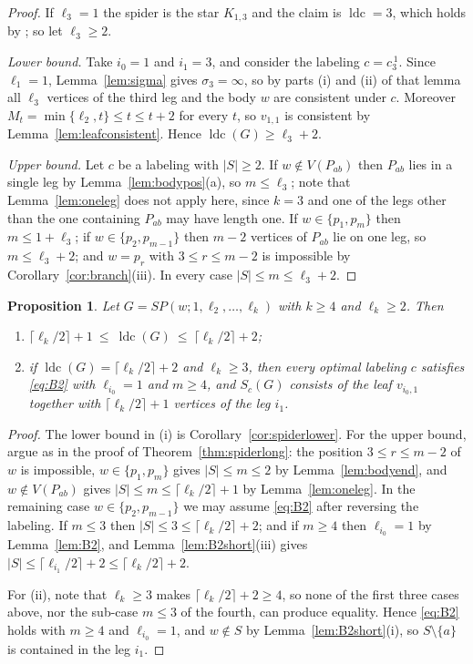 \documentclass[reqno,10pt]{article}
\newtheorem{proposition}[theorem]{Proposition}
\theoremstyle{definition}
\numberwithin{equation}{section}
\numberwithin{theorem}{section}
\newcommand{\ldc}{\operatorname{ldc}}
\newcommand{\Ntwo}{M}
\begin{document}
\begin{proof}
If $\ell_3=1$ the spider is the star $K_{1,3}$ and the claim is $\ldc=3$, which
holds by \cite[Proposition 4.4]{CH2025}; so let $\ell_3\ge2$.

\emph{Lower bound.} Take $i_0=1$ and $i_1=3$, and consider the labeling
$c=c_3^{\,1}$. Since $\ell_1=1$, Lemma~\ref{lem:sigma} gives $\sigma_3=\infty$,
so by parts (i) and (ii) of that lemma all $\ell_3$ vertices of the third leg
and the body $w$ are consistent under $c$. Moreover
$\Ntwo_t=\min\{\ell_2,t\}\le t\le t+2$ for every $t$, so $v_{1,1}$ is consistent by
Lemma~\ref{lem:leafconsistent}. Hence $\ldc(G)\ge\ell_3+2$.

\emph{Upper bound.} Let $c$ be a labeling with $|S|\ge2$. If
$w\notin V(P_{ab})$ then $P_{ab}$ lies in a single leg by
Lemma~\ref{lem:bodypos}(a), so $m\le\ell_3$; note that
Lemma~\ref{lem:oneleg} does not apply here, since $k=3$ and one of the legs
other than the one containing $P_{ab}$ may have length one. If
$w\in\{p_1,p_m\}$ then $m\le1+\ell_3$; if $w\in\{p_2,p_{m-1}\}$ then $m-2$
vertices of $P_{ab}$ lie on one leg, so $m\le\ell_3+2$; and $w=p_r$ with
$3\le r\le m-2$ is impossible by Corollary~\ref{cor:branch}(iii). In every case
$|S|\le m\le\ell_3+2$.
\end{proof}

\begin{proposition}
\label{prop:spiderk4}
Let $G=SP(w;1,\ell_2,\dots,\ell_k)$ with $k\ge4$ and $\ell_k\ge2$. Then
\begin{enumerate}
\item[\textup{(i)}] $\bigl\lceil \ell_k/2\bigr\rceil+1\ \le\ \ldc(G)\ \le\
\bigl\lceil \ell_k/2\bigr\rceil+2$;
\item[\textup{(ii)}] if $\ldc(G)=\lceil \ell_k/2\rceil+2$ and $\ell_k\ge3$, then
every optimal labeling $c$ satisfies \eqref{eq:B2} with $\ell_{i_0}=1$ and
$m\ge4$, and $S_c(G)$ consists of the leaf $v_{i_0,1}$ together with
$\lceil \ell_k/2\rceil+1$ vertices of the leg $i_1$.
\end{enumerate}
\end{proposition}

\begin{proof}
The lower bound in (i) is Corollary~\ref{cor:spiderlower}. For the upper bound,
argue as in the proof of Theorem~\ref{thm:spiderlong}: the position
$3\le r\le m-2$ of $w$ is impossible, $w\in\{p_1,p_m\}$ gives $|S|\le m\le2$ by
Lemma~\ref{lem:bodyend}, and $w\notin V(P_{ab})$ gives
$|S|\le m\le\lceil \ell_k/2\rceil+1$ by Lemma~\ref{lem:oneleg}. In the
remaining case $w\in\{p_2,p_{m-1}\}$ we may assume \eqref{eq:B2} after reversing
the labeling. If $m\le3$ then $|S|\le3\le\lceil \ell_k/2\rceil+2$; and if
$m\ge4$ then $\ell_{i_0}=1$ by Lemma~\ref{lem:B2}, and
Lemma~\ref{lem:B2short}(iii) gives
$|S|\le\lceil \ell_{i_1}/2\rceil+2\le\lceil \ell_k/2\rceil+2$.

For (ii), note that $\ell_k\ge3$ makes $\lceil \ell_k/2\rceil+2\ge4$, so none of
the first three cases above, nor the sub-case $m\le3$ of the fourth, can produce
equality. Hence \eqref{eq:B2} holds with $m\ge4$ and $\ell_{i_0}=1$, and
$w\notin S$ by Lemma~\ref{lem:B2short}(i), so $S\setminus\{a\}$ is contained in
the leg $i_1$.
\end{proof}
\end{document}
